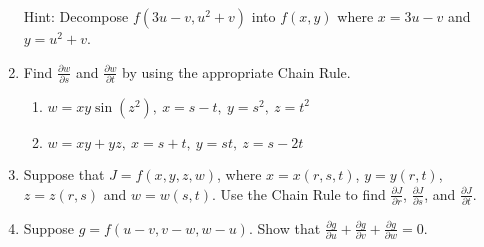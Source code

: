 \documentclass[12pt]{article}
\newif\ifans
\begin{document}
\begin{enumerate}
Hint: Decompose $f(3u-v,u^2+v)$ into $f(x,y)$ where $x=3u-v$ and $y=u^2+v$.

\ifans{\fbox{$g_u(2,-1)=11$; $g_v(2,-1)=8$}} \fi

\newpage

\item Find $\frac{\partial w}{\partial s}$ and $\frac{\partial w}{\partial t}$ by using the appropriate Chain Rule. 

\begin{enumerate}

\item $w=xy\sin{\left(z^2\right)},\ x=s-t,\ y=s^2,\ z=t^2$ 

\ifans{\fbox{$\frac{\partial w}{\partial s}=s^2\sin{\left(t^4\right)}+2s(s-t)\sin{\left(t^4\right)}$; $\frac{\partial w}{\partial t}=-s^2\sin{\left(t^4\right)}+4s^2t^3(s-t)\cos{\left(t^4\right)}$}} \fi

\item $w=xy+yz,\ x=s+t,\ y=st,\ z=s-2t$ 

\ifans{\fbox{$\frac{\partial w}{\partial s}=4st-t^2$; $\frac{\partial w}{\partial t}=2s^2-2st$}} \fi

\end{enumerate}

\item Suppose that $J=f(x,y,z,w)$, where $x=x(r,s,t)$, $y=y(r,t)$, $z=z(r,s)$ and $w=w(s,t)$.  Use the Chain Rule to find $\frac{\partial J}{\partial r}$, $\frac{\partial J}{\partial s}$, and $\frac{\partial J}{\partial t}$.

\ifans{\fbox{\parbox{0.4\linewidth}{$\frac{\partial J}{\partial r}=\frac{\partial f}{\partial x}\frac{\partial x}{\partial r}+\frac{\partial f}{\partial y}\frac{\partial y}{\partial r}+\frac{\partial f}{\partial z}\frac{\partial z}{\partial r}$; \\
\\
$\frac{\partial J}{\partial s}=\frac{\partial f}{\partial x}\frac{\partial x}{\partial s}+\frac{\partial f}{\partial z}\frac{\partial z}{\partial s}+\frac{\partial f}{\partial w}\frac{\partial w}{\partial s}$;\\
\\
$\frac{\partial J}{\partial t}=\frac{\partial f}{\partial x}\frac{\partial x}{\partial t}+\frac{\partial f}{\partial y}\frac{\partial y}{\partial t}+\frac{\partial f}{\partial w}\frac{\partial w}{\partial t}$
}}} \fi

\item Suppose $g=f(u-v,v-w,w-u)$.  Show that $\frac{\partial g}{\partial u}+\frac{\partial g}{\partial v}+\frac{\partial g}{\partial w}=0$.


\end{enumerate}
\end{document}
